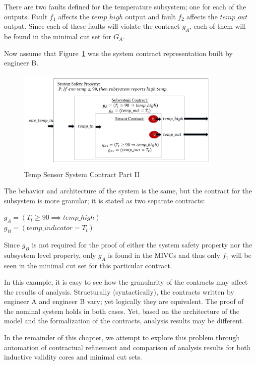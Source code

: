 There are two faults defined for the temperature subsystem; one for each of the outputs. Fault $f_1$ affects the $temp\_high$ output and fault $f_2$ affects the $temp\_out$ output. Since each of these faults will violate the contract $g_A$, each of them will be found in the minimal cut set for $G_A$.

Now assume that Figure~\ref{fig:granularityEx2} was the system contract representation built by engineer B. 

\begin{figure}[h!]
\begin{center}
\includegraphics[width=10cm]{images/granEx2.jpg}
\caption{Temp Sensor System Contract Part II} \label{fig:granularityEx2}
\end{center}
\end{figure} 

The behavior and architecture of the system is the same, but the contract for the subsystem is more granular; it is stated as two separate contracts:
\begin{center}
    $ g_A = (T_t \geq 90 \implies temp\_high)$ \\ 
    $ g_B = (temp\_indicator = T_t)$ 
\end{center}

Since $g_B$ is not required for the proof of either the system safety property nor the subsystem level property, only $g_A$ is found in the MIVCs and thus only $f_1$ will be seen in the minimal cut set for this particular contract. 
 
In this example, it is easy to see how the granularity of the contracts may affect the results of analysis. Structurally (syntactically), the contracts written by engineer A and engineer B vary; yet logically they are equivalent. The proof of the nominal system holds in both cases. Yet, based on the architecture of the model and the formalization of the contracts, analysis results may be different. 

In the remainder of this chapter, we attempt to explore this problem through automation of contractual refinement and comparison of analysis results for both inductive validity cores and minimal cut sets. 